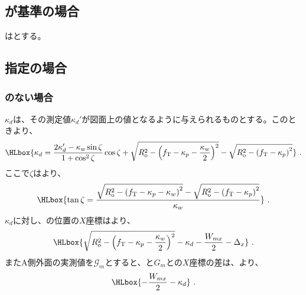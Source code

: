 \subsection{\OutcutCenter が基準の場合}
\KeywayCenter は\TopOutcutCenter とする。


\subsection{\AsideKeywayDepth 指定の場合}

\subsubsection{\Outcut のない場合}
\AsideKeywayDepth$\kappa_d$は、その測定値$\kappa_d'$が図面上の値となるように与えられるものとする。このときより、
\begin{align*}
  \HLbox{%
    \kappa_d
    = \frac{2\kappa_d'-\kappa_w\sin\zeta}{1+\cos^2\zeta}\cos\zeta
      +\sqrt{R_\mathrm o^2-\left(f_\mathrm T-\kappa_p-\frac{\kappa_w}2\right)^2}
      -\sqrt{R_\mathrm o^2-\left(f_\mathrm T-\kappa_p\right)^2}%
  }\ .
\end{align*}
ここで$\zeta$はより、
\begin{align*}
  \HLbox{%
    \tan\zeta
    = \frac{\sqrt{R_\mathrm o^2-\left(f_\mathrm T-\kappa_p-\kappa_w\right)^2}
            -\sqrt{R_\mathrm o^2-\left(f_\mathrm T-\kappa_p\right)^2}}
           {\kappa_w}%
  }\ .
\end{align*}
\AsideKeywayDepth$\kappa_d$に対し、\KeywayCenter の位置の$X$座標はより、
\begin{align*}
  \HLbox{%
    \sqrt{R_\mathrm o^2-\left(f_\mathrm T-\kappa_p-\frac{\kappa_w}2\right)^2}
    -\kappa_d
    -\frac{W_{mx}}2
    -\Delta_x%
  }\ .
\end{align*}
またA側外面の実測値を$\mathcal G_m$とすると、\KeywayCenter と$G_m$との$X$座標の差は、より、
\begin{align*}
  \HLbox{-\frac{W_{mx}}2-\kappa_d}\ .
\end{align*}

